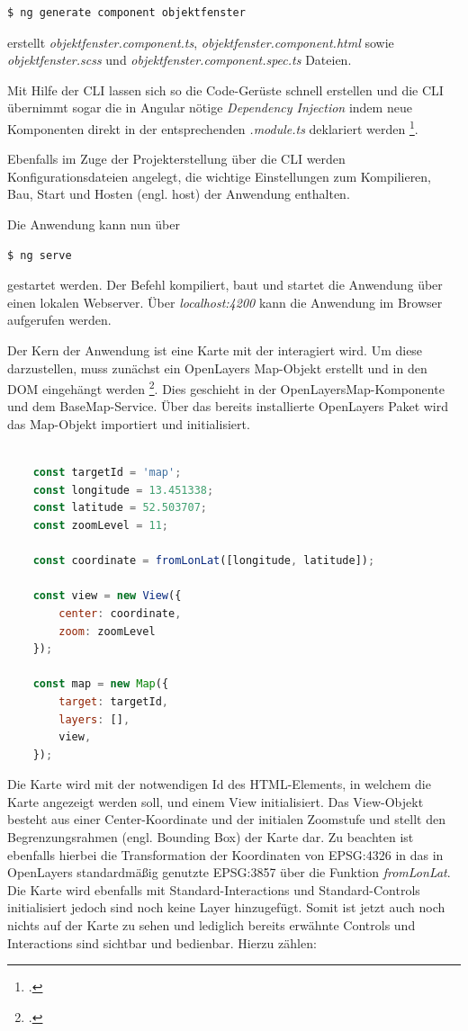 \begin{lstlisting}[language=bash]
$ ng generate component objektfenster
\end{lstlisting}

erstellt \emph{objektfenster.component.ts}, \emph{objektfenster.component.html} sowie \emph{objektfenster.scss} und \emph{objektfenster.component.spec.ts} Dateien.

Mit Hilfe der CLI lassen sich so die Code-Gerüste schnell erstellen und die CLI übernimmt sogar die in Angular nötige \emph{Dependency Injection} indem neue Komponenten direkt in der entsprechenden \emph{.module.ts} deklariert werden \footcite{angular_cli}.

Ebenfalls im Zuge der Projekterstellung über die CLI werden Konfigurationsdateien angelegt, die wichtige Einstellungen zum Kompilieren, Bau, Start und Hosten (engl. host) der Anwendung enthalten.

Die Anwendung kann nun über 

\begin{lstlisting}[language=bash]
	$ ng serve
\end{lstlisting}

gestartet werden.
Der Befehl kompiliert, baut und startet die Anwendung über einen lokalen Webserver.
Über \emph{localhost:4200} kann die Anwendung im Browser aufgerufen werden.

Der Kern der Anwendung ist eine Karte mit der interagiert wird.
Um diese darzustellen, muss zunächst ein OpenLayers Map-Objekt erstellt und in den DOM eingehängt werden \footcite{openlayers_map}.
Dies geschieht in der OpenLayersMap-Komponente und dem BaseMap-Service.
Über das bereits installierte OpenLayers Paket wird das Map-Objekt importiert und initialisiert.

\begin{lstlisting}[language=JavaScript]

	const targetId = 'map';
	const longitude = 13.451338;
	const latitude = 52.503707;
	const zoomLevel = 11;
	
	const coordinate = fromLonLat([longitude, latitude]);
	
	const view = new View({
		center: coordinate,
		zoom: zoomLevel
	});
	
	const map = new Map({
		target: targetId,
		layers: [],
		view,
	});


\end{lstlisting}

Die Karte wird mit der notwendigen Id des HTML-Elements, in welchem die Karte angezeigt werden soll, und einem View initialisiert.
Das View-Objekt besteht aus einer Center-Koordinate und der initialen Zoomstufe und stellt den Begrenzungsrahmen (engl. Bounding Box) der Karte dar.
Zu beachten ist ebenfalls hierbei die Transformation der Koordinaten von EPSG:4326 in das in OpenLayers standardmäßig genutzte EPSG:3857 über die Funktion \emph{fromLonLat}.
Die Karte wird ebenfalls mit Standard-Interactions und Standard-Controls initialisiert jedoch sind noch keine Layer hinzugefügt.
Somit ist jetzt auch noch nichts auf der Karte zu sehen und lediglich bereits erwähnte Controls und Interactions sind sichtbar und bedienbar.
Hierzu zählen:

